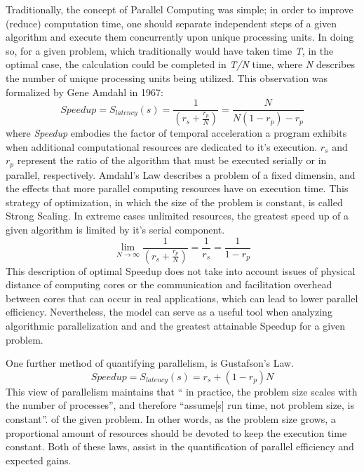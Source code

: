 Traditionally, the concept of Parallel Computing was simple; in order to improve
(reduce) computation time, one should separate independent steps of a given algorithm
and execute them concurrently upon unique processing units.  In doing so, for a given
problem, which traditionally would have taken time \textit{T}, in the optimal case,
the calculation could be completed in \textit{T/N} time, where \textit{N} describes
the number of unique processing units being utilized.  This observation was formalized
by Gene Amdahl in 1967\cite{Wilt}:
%
\begin{equation}
  \tag{Amdahl's Law}
  Speedup = S_{latency}(s)= \frac{1}{(r_{s} + \frac{r_{p}}{N})} = \frac{N}{N(1-r_{p})-r_{p}}
  \label{egn:Amdahl}
\end{equation}
%
where \textit{Speedup} embodies the factor of temporal acceleration a program
exhibits when additional computational resources are dedicated to it's execution.
 \textit{$r_{s}$} and \textit{$ r_{p} $} represent the ratio of the algorithm that must be executed serially or in parallel, respectively.  Amdahl's Law describes a problem of a fixed dimensin,
and the effects that more parallel computing resources have on execution time.
This strategy of optimization, in which the size of the problem is constant,
 is called Strong Scaling.
In extreme cases unlimited resources, the greatest speed up of a given algorithm
 is limited by it's serial component.
%
\begin{equation}
 \lim_{N\to\infty}  \frac{1}{(r_{s} + \frac{r_{p}}{N})} = \frac{1}{r_{s}} = \frac{1}{1-r_{p}}
\end{equation}
%
This description of optimal Speedup does not take into account issues of physical
distance of computing cores or the communication and facilitation overhead between
cores that can occur in real applications, which can lead to lower parallel efficiency.
Nevertheless, the model can serve as a useful tool when analyzing algorithmic
parallelization and and the greatest attainable Speedup for a given problem.\par

One further method of quantifying parallelism, is Gustafson's Law\cite{Gustafson}.
%
\begin{equation}
  \tag{Gustofson's Law}
  Speedup = S_{latency}(s) = r_{s} + (1 - r_{p})N
\end{equation}
%
This view of parallelism maintains that `` in practice, the problem
size scales with the number of processes'', and therefore
``assume[s] run time, not problem size, is constant''.
of the given problem. In other words, as the problem size grows, a proportional
amount of resources should be devoted to keep the execution time constant.
Both of these laws, assist in the quantification of parallel efficiency and
expected gains.



